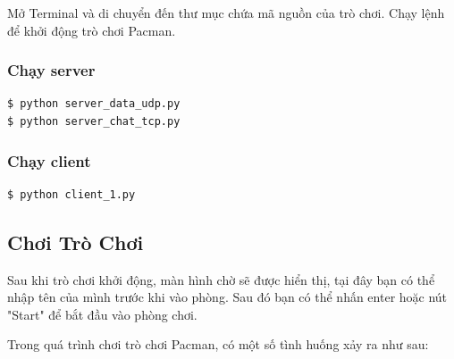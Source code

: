 \documentclass[a4paper]{article}
\begin{document}
Mở Terminal và di chuyển đến thư mục chứa mã nguồn của trò chơi. Chạy lệnh để khởi động trò chơi Pacman.
\subsubsection{Chạy server}
\begin{lstlisting}[language=bash]
$ python server_data_udp.py
$ python server_chat_tcp.py
\end{lstlisting}

\subsubsection{Chạy client}
\begin{lstlisting}[language=bash]
$ python client_1.py
\end{lstlisting}

\subsection{Chơi Trò Chơi}

Sau khi trò chơi khởi động, màn hình chờ sẽ được hiển thị, tại đây bạn có thể nhập tên của mình trước khi vào phòng. Sau đó bạn có thể nhấn enter hoặc nút "Start" để bắt đầu vào phòng chơi.

Trong quá trình chơi trò chơi Pacman, có một số tình huống xảy ra như sau:
\end{document}
